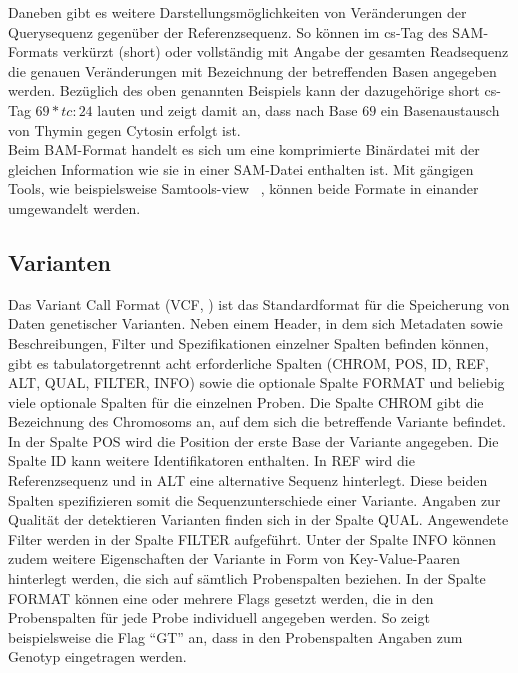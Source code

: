 Daneben gibt es weitere Darstellungsmöglichkeiten von Veränderungen der Querysequenz gegenüber der Referenzsequenz. So können im cs-Tag des SAM-Formats verkürzt (short) oder vollständig mit Angabe der gesamten Readsequenz die genauen Veränderungen mit Bezeichnung der betreffenden Basen angegeben werden. Bezüglich des oben genannten Beispiels kann der dazugehörige short cs-Tag $ 69*tc:24 $ lauten und zeigt damit an, dass nach Base $69$ ein Basenaustausch von Thymin gegen Cytosin erfolgt ist.\\

Beim BAM-Format handelt es sich um eine komprimierte Binärdatei \cite{sam_bam} mit der gleichen Information wie sie in einer SAM-Datei enthalten ist. Mit gängigen Tools, wie beispielsweise Samtools-view ~\cite{li_2009}, können beide Formate in einander umgewandelt werden.

\subsection{Varianten} \label{subsec:vcformat}
Das Variant Call Format (VCF, \cite{danecek_2011}) ist das Standardformat für die Speicherung von Daten genetischer Varianten. Neben einem Header, in dem sich Metadaten sowie Beschreibungen, Filter und Spezifikationen einzelner Spalten befinden können, gibt es tabulatorgetrennt acht erforderliche  Spalten (CHROM, POS, ID, REF, ALT, QUAL, FILTER, INFO) sowie die optionale Spalte FORMAT und beliebig viele optionale Spalten für die einzelnen Proben. Die Spalte CHROM gibt die Bezeichnung des Chromosoms an, auf dem sich die betreffende Variante befindet. In der Spalte POS wird die Position der erste Base der Variante angegeben. Die Spalte ID kann weitere Identifikatoren enthalten. In REF wird die Referenzsequenz und in ALT eine alternative Sequenz hinterlegt. Diese beiden Spalten spezifizieren somit die Sequenzunterschiede einer Variante. Angaben zur Qualität der detektieren Varianten finden sich in der Spalte QUAL. Angewendete Filter werden in der Spalte FILTER aufgeführt. Unter der Spalte INFO können zudem weitere Eigenschaften der Variante in Form von Key-Value-Paaren hinterlegt werden, die sich auf sämtlich Probenspalten beziehen. In der Spalte FORMAT können eine oder mehrere Flags gesetzt werden, die in den Probenspalten für jede Probe individuell angegeben werden. So zeigt beispielsweise die Flag ``GT'' an, dass in den Probenspalten Angaben zum Genotyp eingetragen werden.
\let\cleardoublepage\clearpage
